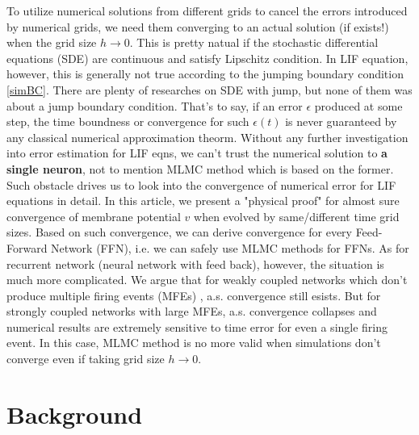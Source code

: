 \documentclass[10pt]{article}
\begin{document}
\begin{multicols}{2}
\indent
To utilize numerical solutions from different grids to cancel the errors introduced by numerical grids, we need them converging to an actual solution (if exists!) when the grid size $h\rightarrow0$. This is pretty natual if the stochastic differential equations (SDE) are continuous and satisfy Lipschitz condition. In LIF equation, however, this is generally not true according to the jumping boundary condition \ref{simBC}. There are plenty of researches on SDE with jump, but none of them was about a jump boundary condition. That's to say, if an error $\epsilon$ produced at some step, the time boundness or convergence for such $\epsilon(t)$ is never guaranteed by any classical numerical approximation theorm. Without any further investigation into error estimation for LIF eqns, we can't trust the numerical solution to {\bf{a single neuron}}, not to mention MLMC method which is based on the former.\\
\indent
Such obstacle drives us to look into the convergence of numerical error for LIF equations in detail. In this article, we present a "physical proof" for almost sure convergence of membrane potential $v$ when evolved by same/different time grid sizes. Based on such convergence, we can derive convergence for every Feed-Forward Network (FFN), i.e. we can safely use MLMC methods for FFNs. As for recurrent network (neural network with feed back), however, the situation is much more complicated. We argue that for weakly coupled networks which don't produce multiple firing events (MFEs) \cite{MFE}, a.s. convergence still esists. But for strongly coupled networks with large MFEs, a.s. convergence collapses and numerical results are extremely sensitive to time error for even a single firing event. In this case, MLMC method is no more valid when simulations don't converge even if taking grid size $h\rightarrow0$.  

\section{Background}

\end{multicols}
\end{document}
